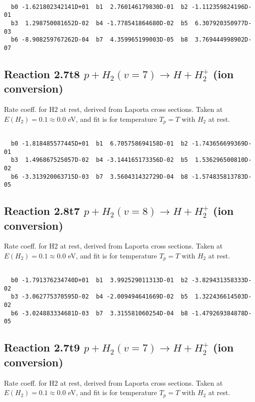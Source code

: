 \begin{small}\begin{verbatim}

  b0 -1.621802342141D+01  b1  2.760146179830D-01  b2 -1.112359824196D-01
  b3  1.298750081652D-02  b4 -1.778541864680D-02  b5  6.307920350977D-03
  b6 -8.908259767262D-04  b7  4.359965199003D-05  b8  3.769444998902D-07

\end{verbatim}\end{small}

\newpage
\subsection{
Reaction 2.7t8
$ p + H_2(v=7) \rightarrow H + H_2^+$ (ion conversion)
}
Rate coeff. for H2 at rest, derived from Laporta cross sections.
Taken at $E(H_2) = 0.1 \approx 0.0$ eV,  and fit is for temperature $T_p=T$ with $H_2$ at rest.

\begin{small}\begin{verbatim}

  b0 -1.818485577445D+01  b1  6.705758694158D-01  b2 -1.743656699369D-01
  b3  1.496867525057D-02  b4 -3.144165173356D-02  b5  1.536296500810D-02
  b6 -3.313920063715D-03  b7  3.560431432729D-04  b8 -1.574835813783D-05

\end{verbatim}\end{small}

\newpage
\subsection{
Reaction 2.8t7
$ p + H_2(v=8) \rightarrow H + H_2^+$ (ion conversion)
}
Rate coeff. for H2 at rest, derived from Laporta cross sections.
Taken at $E(H_2) = 0.1 \approx 0.0$ eV,  and fit is for temperature $T_p=T$ with $H_2$ at rest.

\begin{small}\begin{verbatim}

  b0 -1.791376234740D+01  b1  3.992529011313D-01  b2 -3.829431358333D-02
  b3 -3.062775370595D-02  b4 -2.009494641669D-02  b5  1.322436614503D-02
  b6 -3.024883334681D-03  b7  3.315581060254D-04  b8 -1.479269384878D-05

\end{verbatim}\end{small}

\newpage
\subsection{
Reaction 2.7t9
$ p + H_2(v=7) \rightarrow H + H_2^+$ (ion conversion)
}
Rate coeff. for H2 at rest, derived from Laporta cross sections.
Taken at $E(H_2) = 0.1 \approx 0.0$ eV,  and fit is for temperature $T_p=T$ with $H_2$ at rest.

